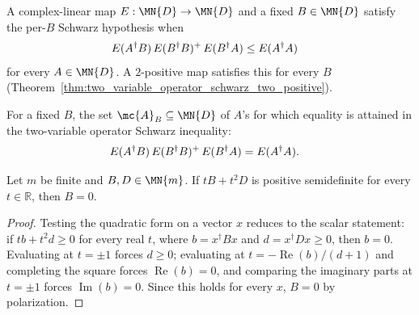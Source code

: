 \begin{definition}\label{def:has_schwarz_inequality_for}
    \leanok
    A complex-linear map $E:\MN{D}\to\MN{D}$ and a fixed $B\in\MN{D}$
    satisfy the per-$B$ Schwarz hypothesis when
    \begin{align}
        E(A^\dagger B)\,E(B^\dagger B)^{+}\,E(B^\dagger A)
         & \le E(A^\dagger A)
        \notag
    \end{align}
    for every $A\in\MN{D}$. A $2$-positive map satisfies this for every
    $B$ (Theorem~\ref{thm:two_variable_operator_schwarz_two_positive}).
\end{definition}

\begin{definition}\label{def:equality_attaining}
    \leanok
    For a fixed $B$, the set $\mc{A}_B\subseteq\MN{D}$ of $A$'s for which
    equality is attained in the two-variable operator Schwarz inequality:
    \begin{align}
        E(A^\dagger B)\,E(B^\dagger B)^{+}\,E(B^\dagger A)
         & = E(A^\dagger A).
        \notag
    \end{align}
\end{definition}

\begin{theorem}
    \label{thm:eq_zero_of_forall_quadratic_posSemidef}
    \leanok
    Let $m$ be finite and $B,D\in\MN{m}$. If
    $tB+t^2D$ is positive semidefinite for every $t\in\mathbb R$, then
    $B=0$.
\end{theorem}

\begin{proof}\leanok
    Testing the quadratic form on a vector $x$ reduces to the scalar
    statement: if $tb+t^2d\ge0$ for every real $t$, where
    $b=x^\dagger Bx$ and $d=x^\dagger Dx\ge0$, then $b=0$. Evaluating at
    $t=\pm1$ forces $d\ge0$; evaluating at $t=-\operatorname{Re}(b)/(d+1)$
    and completing the square forces $\operatorname{Re}(b)=0$, and
    comparing the imaginary parts at $t=\pm1$ forces
    $\operatorname{Im}(b)=0$. Since this holds for every $x$, $B=0$ by
    polarization.
\end{proof}

